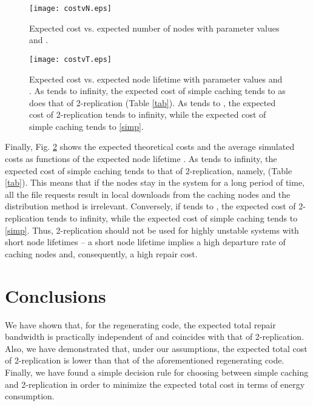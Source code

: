 \documentclass[10pt,conference]{IEEEtran}
\begin{document}
\begin{figure}[tb]
\centering \texttt{[image: costvN.eps]}
\caption{Expected cost vs. expected number of nodes  with parameter values  and .}
\label{costvN}
\end{figure}

\begin{figure}[tb]
\centering \texttt{[image: costvT.eps]}
\caption{Expected cost vs. expected node lifetime  with parameter values  and . As  tends to infinity, the expected cost of simple caching tends to  as does that of 2-replication (Table \ref{tab}). As  tends to , the expected cost of 2-replication tends to infinity, while the expected cost of simple caching tends to  \eqref{simp}.}
\label{costvT}
\end{figure}

Finally, Fig. \ref{costvT} shows the expected theoretical costs and the average simulated costs as functions of the expected node lifetime . As  tends to infinity, the expected cost of simple caching tends to that of 2-replication, namely,  (Table \ref{tab}). This means that if the nodes stay in the system for a long period of time, all the file requests result in local downloads from the caching nodes and the distribution method is irrelevant. Conversely, if  tends to , the expected cost of 2-replication tends to infinity, while the expected cost of simple caching tends to  \eqref{simp}. Thus, 2-replication should not be used for highly unstable systems with short node lifetimes -- a short node lifetime implies a high departure rate of caching nodes and, consequently, a high repair cost.

\section{Conclusions}\label{conclusionssec}
We have shown that, for the  regenerating code, the expected total repair bandwidth is practically independent of  and coincides with that of 2-replication. Also, we have demonstrated that, under our assumptions, the expected total cost of 2-replication is lower than that of the aforementioned regenerating code. Finally, we have found a simple decision rule for choosing between simple caching and 2-replication in order to minimize the expected total cost in terms of energy consumption.
\end{document}

